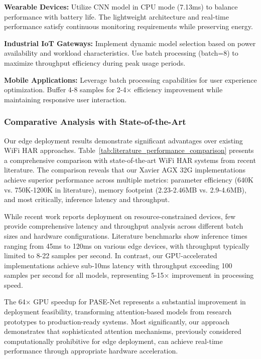 \textbf{Wearable Devices:} Utilize CNN model in CPU mode (7.13ms) to balance performance with battery life. The lightweight architecture and real-time performance satisfy continuous monitoring requirements while preserving energy.

\textbf{Industrial IoT Gateways:} Implement dynamic model selection based on power availability and workload characteristics. Use batch processing (batch=8) to maximize throughput efficiency during peak usage periods.

\textbf{Mobile Applications:} Leverage batch processing capabilities for user experience optimization. Buffer 4-8 samples for 2-4× efficiency improvement while maintaining responsive user interaction.

\subsubsection{Comparative Analysis with State-of-the-Art}

Our edge deployment results demonstrate significant advantages over existing WiFi HAR approaches. Table~\ref{tab:literature_performance_comparison} presents a comprehensive comparison with state-of-the-art WiFi HAR systems from recent literature. The comparison reveals that our Xavier AGX 32G implementations achieve superior performance across multiple metrics: parameter efficiency (640K vs. 750K-1200K in literature), memory footprint (2.23-2.46MB vs. 2.9-4.6MB), and most critically, inference latency and throughput.

While recent work reports deployment on resource-constrained devices, few provide comprehensive latency and throughput analysis across different batch sizes and hardware configurations. Literature benchmarks show inference times ranging from 45ms to 120ms on various edge devices, with throughput typically limited to 8-22 samples per second. In contrast, our GPU-accelerated implementations achieve sub-10ms latency with throughput exceeding 100 samples per second for all models, representing 5-15× improvement in processing speed.

The 64× GPU speedup for PASE-Net represents a substantial improvement in deployment feasibility, transforming attention-based models from research prototypes to production-ready systems. Most significantly, our approach demonstrates that sophisticated attention mechanisms, previously considered computationally prohibitive for edge deployment, can achieve real-time performance through appropriate hardware acceleration.

